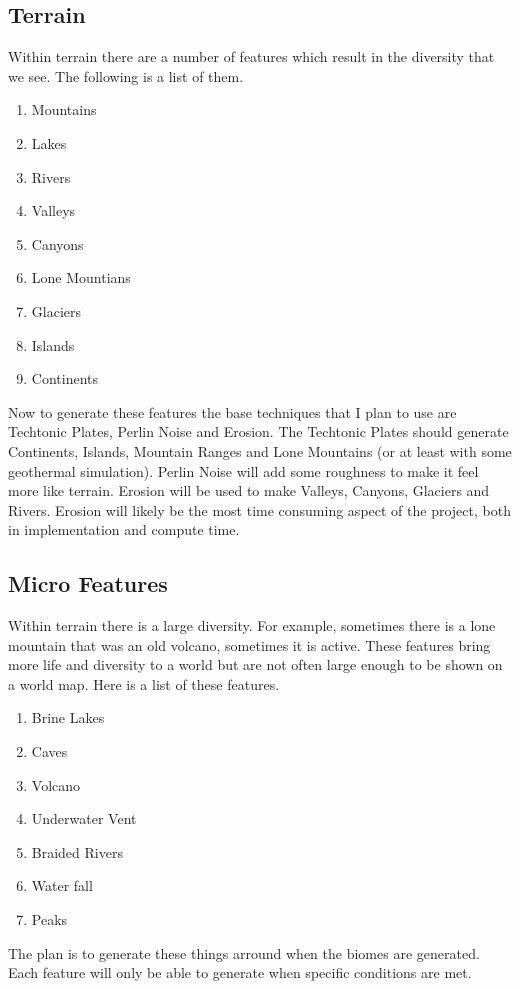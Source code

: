 \documentclass[11pt]{article}
\begin{document}
    \subsection{Terrain}\label{subsec:terrain}
    Within terrain there are a number of features which result in the diversity that we see.
    The following is a list of them.
    \begin{enumerate}
        \item Mountains
        \item Lakes
        \item Rivers
        \item Valleys
        \item Canyons
        \item Lone Mountians
        \item Glaciers
        \item Islands
        \item Continents
    \end{enumerate}
    Now to generate these features the base techniques that I plan to use are Techtonic Plates, Perlin Noise and Erosion.
    The Techtonic Plates should generate Continents, Islands, Mountain Ranges and Lone Mountains (or at least with some geothermal simulation).
    Perlin Noise will add some roughness to make it feel more like terrain.
    Erosion will be used to make Valleys, Canyons, Glaciers and Rivers.
    Erosion will likely be the most time consuming aspect of the project, both in implementation and compute time.
    \subsection{Micro Features}\label{subsec:micro-features}
    Within terrain there is a large diversity.
    For example, sometimes there is a lone mountain that was an old volcano, sometimes it is active.
    These features bring more life and diversity to a world but are not often large enough to be shown on a world map.
    Here is a list of these features.
    \begin{enumerate}
        \item Brine Lakes
        \item Caves
        \item Volcano
        \item Underwater Vent
        \item Braided Rivers
        \item Water fall
        \item Peaks
    \end{enumerate}
    The plan is to generate these things arround when the biomes are generated.
    Each feature will only be able to generate when specific conditions are met.
\end{document}

